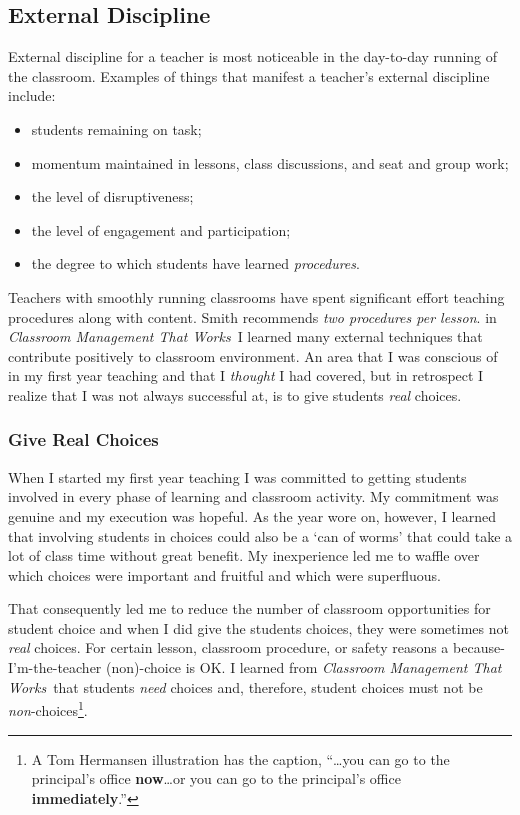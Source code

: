 \documentclass[11pt,twocolumn]{article}%
\def\cmtw{{\em Classroom Management That Works}}
\begin{document}
\subsection{External Discipline}
\label{External Discipline}

External discipline for a teacher is most noticeable in the
day-to-day running of the classroom. Examples of things that
manifest a teacher's external discipline include:

\begin{itemize}

\item students remaining on task;
\item momentum maintained in lessons, class discussions, and seat and group work;
\item the level of disruptiveness;
\item the level of engagement and participation;
\item the degree to which students have learned {\em procedures}.

\end{itemize}

Teachers with smoothly running classrooms have spent significant
effort teaching procedures along with content. Smith
\cite[p.~90]{book:ccm} recommends {\em two procedures per lesson}. in
\cmtw\ I learned many external techniques that contribute positively
to classroom environment. An area that I was conscious of in my
first year teaching and that I {\em thought} I had covered, but in
retrospect I realize that I was not always successful at, is to give
students {\em real} choices.


\subsubsection{Give Real Choices}
\label{Give Real Choices}

When I started my first year teaching I was committed to getting
students involved in every phase of learning and classroom activity.
My commitment was genuine and my execution was hopeful. As the year
wore on, however, I learned that involving students in choices could
also be a `can of worms' that could take a lot of class time without
great benefit. My inexperience led me to waffle over which choices
were important and fruitful and which were superfluous.

That consequently led me to reduce the number of classroom
opportunities for student choice and when I did give the students
choices, they were sometimes not {\em real} choices. For certain
lesson, classroom procedure, or safety reasons a
because-I'm-the-teacher (non)-choice is OK. I learned from \cmtw\
that students {\em need} choices and, therefore, student choices
must not be {\em non}-choices\footnote{A Tom Hermansen illustration
\cite[p. 65]{book:ccm} has the caption, ``\dots you can go to the
principal's office {\bf now}\dots or you can go to the principal's
office {\bf immediately}.''}.
\end{document}

